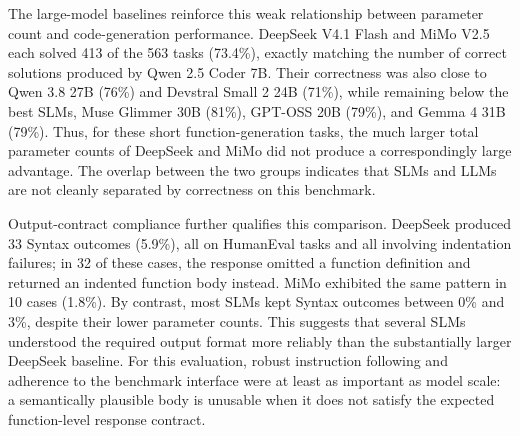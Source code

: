 The large-model baselines reinforce this weak relationship between parameter count and code-generation performance. DeepSeek V4.1 Flash and MiMo V2.5 each solved 413 of the 563 tasks (73.4\%), exactly matching the number of correct solutions produced by Qwen 2.5 Coder 7B. Their correctness was also close to Qwen 3.8 27B (76\%) and Devstral Small 2 24B (71\%), while remaining below the best SLMs, Muse Glimmer 30B (81\%), GPT-OSS 20B (79\%), and Gemma 4 31B (79\%). Thus, for these short function-generation tasks, the much larger total parameter counts of DeepSeek and MiMo did not produce a correspondingly large advantage. The overlap between the two groups indicates that SLMs and LLMs are not cleanly separated by correctness on this benchmark.

Output-contract compliance further qualifies this comparison. DeepSeek produced 33 Syntax outcomes (5.9\%), all on HumanEval tasks and all involving indentation failures; in 32 of these cases, the response omitted a function definition and returned an indented function body instead. MiMo exhibited the same pattern in 10 cases (1.8\%). By contrast, most SLMs kept Syntax outcomes between 0\% and 3\%, despite their lower parameter counts. This suggests that several SLMs understood the required output format more reliably than the substantially larger DeepSeek baseline. For this evaluation, robust instruction following and adherence to the benchmark interface were at least as important as model scale: a semantically plausible body is unusable when it does not satisfy the expected function-level response contract.


